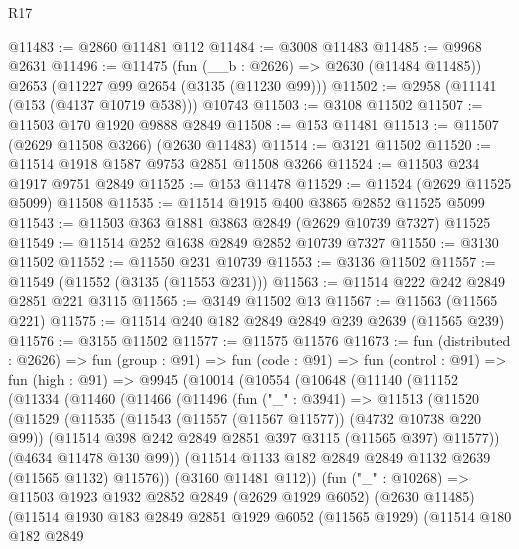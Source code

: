 \begin{lexlean}{R17}
\begin{coremodule}
@11483 := @2860 @11481 @112
@11484 := @3008 @11483
@11485 := @9968 @2631
@11496 := @11475
    (fun (__b : @2626) => @2630 (@11484 @11485))
    @2653
    (@11227 @99 @2654 (@3135 (@11230 @99)))
@11502 := @2958 (@11141 (@153 (@4137 @10719 @538))) @10743
@11503 := @3108 @11502
@11507 := @11503 @170 @1920 @9888 @2849
@11508 := @153 @11481
@11513 := @11507 (@2629 @11508 @3266) (@2630 @11483)
@11514 := @3121 @11502
@11520 := @11514 @1918 @1587 @9753 @2851 @11508 @3266
@11524 := @11503 @234 @1917 @9751 @2849
@11525 := @153 @11478
@11529 := @11524 (@2629 @11525 @5099) @11508
@11535 := @11514 @1915 @400 @3865 @2852 @11525 @5099
@11543 := @11503 @363 @1881 @3863 @2849 (@2629 @10739 @7327) @11525
@11549 := @11514 @252 @1638 @2849 @2852 @10739 @7327
@11550 := @3130 @11502
@11552 := @11550 @231 @10739
@11553 := @3136 @11502
@11557 := @11549 (@11552 (@3135 (@11553 @231)))
@11563 := @11514 @222 @242 @2849 @2851 @221 @3115
@11565 := @3149 @11502 @13
@11567 := @11563 (@11565 @221)
@11575 := @11514 @240 @182 @2849 @2849 @239 @2639 (@11565 @239)
@11576 := @3155 @11502
@11577 := @11575 @11576
@11673 := fun (distributed : @2626) =>
  fun (group : @91) =>
  fun (code : @91) =>
  fun (control : @91) =>
  fun (high : @91) =>
  @9945
    (@10014
      (@10554
        (@10648
          (@11140
            (@11152
              (@11334
                (@11460
                  (@11466
                    (@11496
                      (fun ("_" : @3941) =>
                      @11513
                        (@11520
                          (@11529
                            (@11535
                              (@11543 (@11557 (@11567 @11577)) (@4732 @10738 @220 @99))
                              (@11514 @398 @242 @2849 @2851 @397 @3115 (@11565 @397) @11577))
                            (@4634 @11478 @130 @99))
                          (@11514 @1133 @182 @2849 @2849 @1132 @2639 (@11565 @1132) @11576))
                        (@3160 @11481 @112))
                      (fun ("_" : @10268) =>
                      @11503
                        @1923
                        @1932
                        @2852
                        @2849
                        (@2629 @1929 @6052)
                        (@2630 @11485)
                        (@11514
                          @1930
                          @183
                          @2849
                          @2851
                          @1929
                          @6052
                          (@11565 @1929)
                          (@11514
                            @180
                            @182
                            @2849

\end{coremodule}
\end{lexlean}
